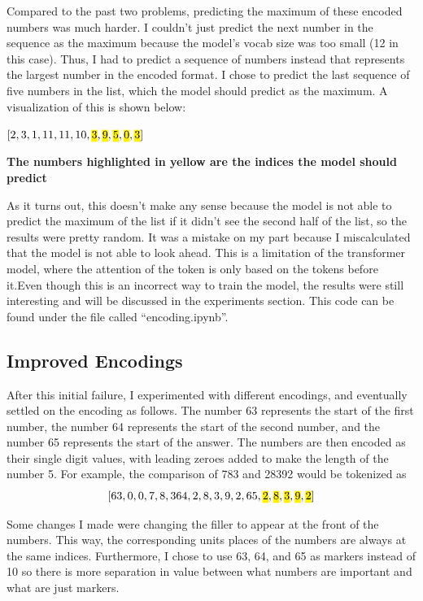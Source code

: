 \documentclass{article}
\begin{document}
Compared to the past two problems, predicting the maximum of these encoded numbers was much harder. I couldn't just predict the next number in the sequence as the maximum because the model's vocab size was too small (12 in this case). Thus, I had to predict a sequence of numbers instead that represents the largest number in the encoded format. I chose to predict the last sequence of five numbers in the list, which the model should predict as the maximum. A visualization of this is shown below:

\begin{center}
    $[2, 3, 1, 11, 11, 10, \text{\hl{3}}, \text{\hl{9}}, \text{\hl{5}}, \text{\hl{0}}, \text{\hl{3}}]$

    \textbf{The numbers highlighted in yellow are the indices the model should predict}
\end{center}

As it turns out, this doesn't make any sense because the model is not able to predict the maximum of the list if it didn't see the second half of the list, so the results were pretty random. It was a mistake on my part because I miscalculated that the model is not able to look ahead. This is a limitation of the transformer model, where the attention of the token is only based on the tokens before it.Even though this is an incorrect way to train the model, the results were still interesting and will be discussed in the experiments section. This code can be found under the file called ``encoding.ipynb''. 

\subsection{Improved Encodings}
After this initial failure, I experimented with different encodings, and eventually settled on the encoding as follows. The number 63 represents the start of the first number, the number 64 represents the start of the second number, and the number 65 represents the start of the answer. The numbers are then encoded as their single digit values, with leading zeroes added to make the length of the number 5. For example, the comparison of 783 and 28392 would be tokenized as
$$
[63, 0, 0, 7, 8, 3 64, 2, 8, 3, 9, 2, 65, \text{\hl{2}}, \text{\hl{8}}, \text{\hl{3}}, \text{\hl{9}}, \text{\hl{2}}]
$$

Some changes I made were changing the filler to appear at the front of the numbers. This way, the corresponding units places of the numbers are always at the same indices. Furthermore, I chose to use 63, 64, and 65 as markers instead of 10 so there is more separation in value between what numbers are important and what are just markers. 
\end{document}
